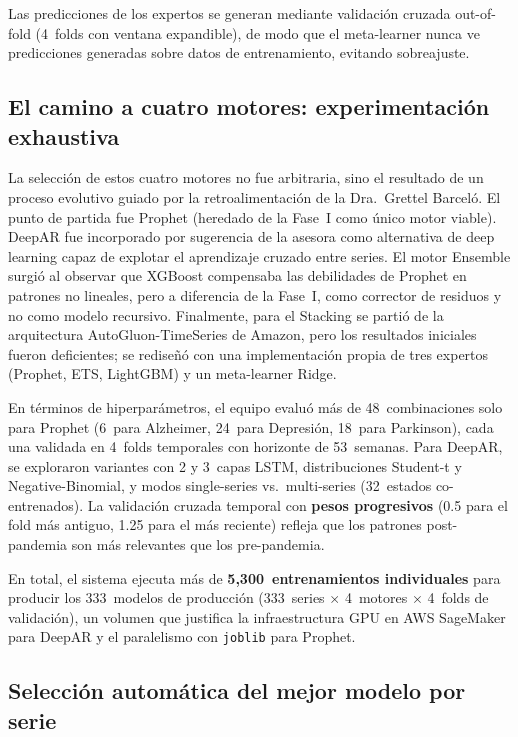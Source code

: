 \documentclass[12pt, letterpaper]{article}
\begin{document}
Las predicciones de los expertos se generan mediante validación cruzada out-of-fold (4~folds con ventana expandible), de modo que el meta-learner nunca ve predicciones generadas sobre datos de entrenamiento, evitando sobreajuste.

\subsection{El camino a cuatro motores: experimentación exhaustiva}

La selección de estos cuatro motores no fue arbitraria, sino el resultado de un proceso evolutivo guiado por la retroalimentación de la Dra.~Grettel Barceló. El punto de partida fue Prophet (heredado de la Fase~I como único motor viable). DeepAR fue incorporado por sugerencia de la asesora como alternativa de deep learning capaz de explotar el aprendizaje cruzado entre series. El motor Ensemble surgió al observar que XGBoost compensaba las debilidades de Prophet en patrones no lineales, pero a diferencia de la Fase~I, como corrector de residuos y no como modelo recursivo. Finalmente, para el Stacking se partió de la arquitectura AutoGluon-TimeSeries de Amazon, pero los resultados iniciales fueron deficientes; se rediseñó con una implementación propia de tres expertos (Prophet, ETS, LightGBM) y un meta-learner Ridge.

En términos de hiperparámetros, el equipo evaluó más de 48~combinaciones solo para Prophet (6~para Alzheimer, 24~para Depresión, 18~para Parkinson), cada una validada en 4~folds temporales con horizonte de 53~semanas. Para DeepAR, se exploraron variantes con 2 y 3~capas LSTM, distribuciones Student-t y Negative-Binomial, y modos single-series vs.\ multi-series (32~estados co-entrenados). La validación cruzada temporal con \textbf{pesos progresivos} (0.5 para el fold más antiguo, 1.25 para el más reciente) refleja que los patrones post-pandemia son más relevantes que los pre-pandemia.

En total, el sistema ejecuta más de \textbf{5,300~entrenamientos individuales} para producir los 333~modelos de producción (333~series $\times$ 4~motores $\times$ 4~folds de validación), un volumen que justifica la infraestructura GPU en AWS SageMaker para DeepAR y el paralelismo con \texttt{joblib} para Prophet.

\subsection{Selección automática del mejor modelo por serie}
\end{document}
